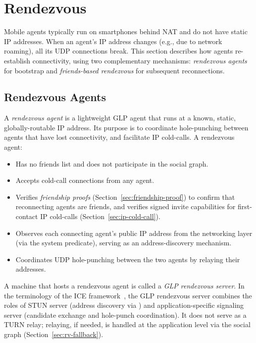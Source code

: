 \section{Rendezvous}
\label{sec:rendezvous}
Mobile agents typically run on smartphones behind NAT and do not have static IP addresses.  When an agent's IP address changes (e.g., due to network roaming), all its UDP connections break.  This section describes how agents re-establish connectivity, using two complementary mechanisms: \emph{rendezvous agents} for bootstrap and \emph{friends-based rendezvous} for subsequent reconnections.

\subsection{Rendezvous Agents}
\label{sec:rv-agents}
A \emph{rendezvous agent} is a lightweight GLP agent that runs at a known, static, globally-routable IP address.  Its purpose is to coordinate hole-punching between agents that have lost connectivity, and facilitate IP cold-calls.  A rendezvous agent:

\begin{itemize}
\item Has no friends list and does not participate in the social graph.
\item Accepts cold-call connections from any agent.
\item Verifies \emph{friendship proofs} (Section~\ref{sec:friendship-proof}) to confirm that reconnecting agents are friends, and verifies signed invite capabilities for first-contact IP cold-calls (Section~\ref{sec:ip-cold-call}).
\item Observes each connecting agent's public IP address from the networking layer (via the  system predicate), serving as an address-discovery mechanism.
\item Coordinates UDP hole-punching between the two agents by relaying their addresses.
\end{itemize}

A machine that hosts a rendezvous agent is called a \emph{GLP rendezvous server}.  In the terminology of the ICE framework~\cite{rfc8445}, the GLP rendezvous server combines the roles of STUN server (address discovery via ) and application-specific signaling server (candidate exchange and hole-punch coordination).  It does not serve as a TURN relay; relaying, if needed, is handled at the application level via the social graph (Section~\ref{sec:rv-fallback}).

